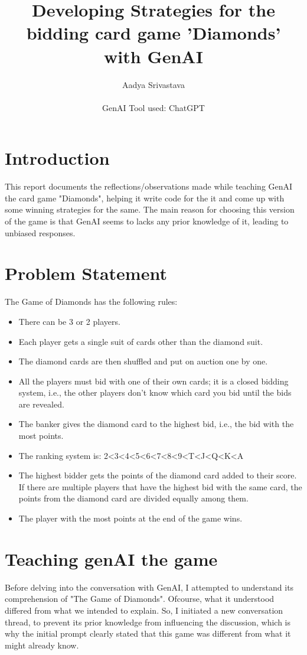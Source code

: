 \documentclass[10pt,onecolumn,letterpaper]{article}
\title{
    \usefont{OT1}{bch}{b}{n}
    \huge Developing Strategies for the bidding card game 'Diamonds' with GenAI
}
\author{\large Aadya Srivastava \\ \\ GenAI Tool used: ChatGPT}
\begin{document}
\maketitle
{}

\section{Introduction}
This report documents the reflections/observations made while teaching GenAI the card game "Diamonds", helping it write code for the it and come up with some winning strategies for the same. The main reason for choosing this version of the game is that GenAI seems to lacks any prior knowledge of it, leading to unbiased responses.

\section{Problem Statement} 
The Game of Diamonds has the following rules:
\begin{itemize}
    \item There can be 3 or 2 players.
    \item Each player gets a single suit of cards other than the diamond suit.
    \item The diamond cards are then shuffled and put on auction one by one.
    \item All the players must bid with one of their own cards; it is a closed bidding system, i.e., the other players don’t know which card you bid until the bids are revealed.
    \item The banker gives the diamond card to the highest bid, i.e., the bid with the most points.
    \item The ranking system is: 2<3<4<5<6<7<8<9<T<J<Q<K<A
    \item The highest bidder gets the points of the diamond card added to their score. If there are multiple players that have the highest bid with the same card, the points from the diamond card are divided equally among them.
    \item The player with the most points at the end of the game wins.
\end{itemize}
\section{Teaching genAI the game}
Before delving into the conversation with GenAI, I attempted to understand its comprehension of "The Game of Diamonds". Ofcourse, what it understood  differed from what we intended to explain. So, I initiated a new conversation thread, to prevent its prior knowledge from influencing the discussion, which is why the initial prompt clearly stated that this game was different from what it might already know.
\end{document}
